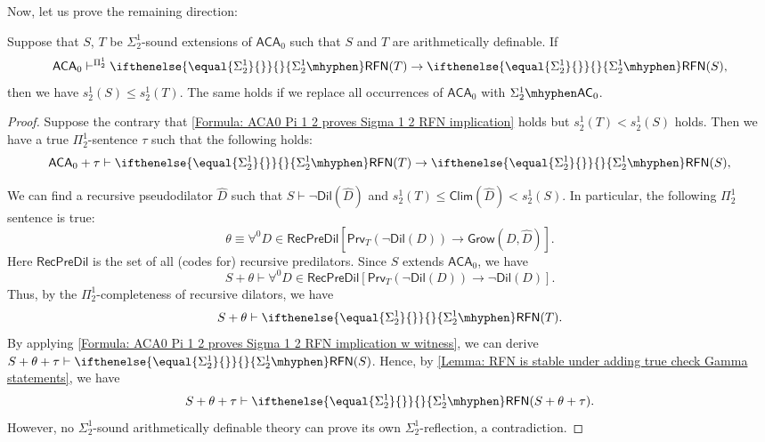 \documentclass{mhkr}
\newcommand{\added}[1]{#1}
\newcommand{\Clim}{\mathsf{Clim}}
\newcommand{\Grow}{\mathsf{Grow}}
\newcommand{\Dil}{\mathsf{Dil}}
\newcommand{\Prv}{\mathsf{Prv}}
\newcommand{\RFN}[1][]{\ifthenelse{\equal{#1}{}}{}{#1\mhyphen}\mathsf{RFN}}
\newcommand{\AC}{\mathsf{AC}}
\newcommand{\ACA}{\mathsf{ACA}}
\begin{document}
Now, let us prove the remaining direction:
\begin{proposition} \label{Proposition: Second equivalence RtoL for Sigma 1 2}
    Suppose that $S$, $T$ be $\Sigma^1_2$-sound extensions of $\ACA_0$ such that \added{$S$ and $T$ are} arithmetically definable. If
    \begin{equation} \label{Formula: ACA0 Pi 1 2 proves Sigma 1 2 RFN implication}
        \ACA_0\vdash^{\Pi^1_2} \RFN[\Sigma^1_2](T)\to\RFN[\Sigma^1_2](S),
    \end{equation}
    then we have $s^1_2(S)\le s^1_2(T)$. The same holds if we replace all occurrences of $\ACA_0$ \added{with} $\Sigma^1_2\mhyphen \AC_0$.
\end{proposition}
\begin{proof}
    Suppose the contrary that \eqref{Formula: ACA0 Pi 1 2 proves Sigma 1 2 RFN implication} holds but $s^1_2(T) < s^1_2(S)$ holds. Then we have a true $\Pi^1_2$-sentence $\tau$ such that the following holds:
    \begin{equation} \label{Formula: ACA0 Pi 1 2 proves Sigma 1 2 RFN implication w witness}
        \ACA_0 + \tau\vdash \RFN[\Sigma^1_2](T)\to\RFN[\Sigma^1_2](S),
    \end{equation}
    
    We can find a recursive pseudodilator $\hat{D}$ such that $S\vdash\lnot\Dil(\hat{D})$ and $s^1_2(T) \le \Clim(\hat{D}) < s^1_2(S)$. \added{In particular}, the following $\Pi^1_2$ sentence is true:
    \begin{equation*}
        \theta \equiv \forall^0 D \in \mathsf{RecPreDil} [\Prv_T(\lnot\Dil(D))\to \Grow(D,\hat{D})].
    \end{equation*}
    Here $\mathsf{RecPreDil}$ is the set of all (codes for) recursive predilators. Since $S$ extends $\ACA_0$, we have
    \begin{equation*}
        S + \theta \vdash \forall^0 D \in \mathsf{RecPreDil} [\Prv_T(\lnot\Dil(D))\to \lnot\Dil(D)].
    \end{equation*}
    Thus, by the $\Pi^1_2$-completeness of recursive dilators, we have
    \begin{equation*}
        S + \theta \vdash \RFN[\Sigma^1_2](T).
    \end{equation*}
    By applying \eqref{Formula: ACA0 Pi 1 2 proves Sigma 1 2 RFN implication w witness}, we can derive $S + \theta + \tau \vdash \RFN[\Sigma^1_2](S)$. Hence, by \autoref{Lemma: RFN is stable under adding true check Gamma statements}, we have
    \begin{equation*}
        S + \theta +\tau \vdash \RFN[\Sigma^1_2](S + \theta + \tau).
    \end{equation*}
    However, no \added{$\Sigma^1_2$-sound arithmetically definable} theory can prove its own $\Sigma^1_2$-reflection, a contradiction.
\end{proof}
\end{document}

